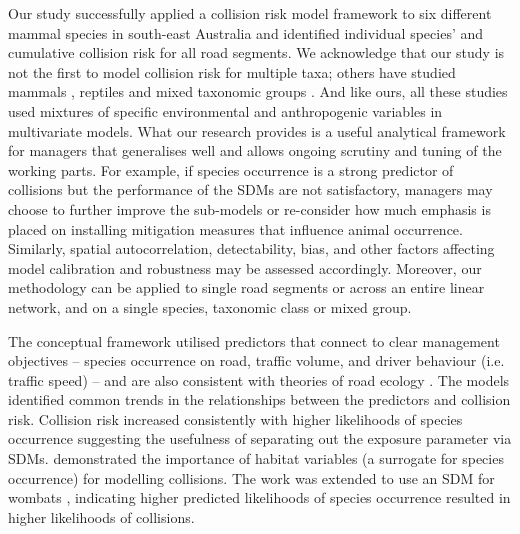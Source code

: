 Our study successfully applied a collision risk model framework to six different mammal species in south-east Australia and identified individual species' and cumulative collision risk for all road segments. We acknowledge that our study is not the first to model collision risk for multiple taxa; others have studied mammals \citep{clev02,cser13,jaar06}, reptiles \citep{guns12,lang12} and mixed taxonomic groups \citep{clev02,garr15,lang09,litv08}.  And like ours, all these studies used mixtures of specific environmental and anthropogenic variables in multivariate models. What our research provides is a useful analytical framework for managers that generalises well and allows ongoing scrutiny and tuning of the working parts.  For example, if species occurrence is a strong predictor of collisions but the performance of the SDMs are not satisfactory, managers may choose to further improve the sub-models or re-consider how much emphasis is placed on installing mitigation measures that influence animal occurrence.  Similarly, spatial autocorrelation, detectability, bias, and other factors affecting model calibration and robustness may be assessed accordingly. Moreover, our methodology can be applied to single road segments or across an entire linear network, and on a single species, taxonomic class or mixed group.

The conceptual framework utilised predictors that connect to clear management objectives -- species occurrence on road, traffic volume, and driver behaviour (i.e. traffic speed) -- and are also consistent with theories of road ecology \citep[see][]{form03}. The models identified common trends in the relationships between the predictors and collision risk. Collision risk increased consistently with higher likelihoods of species occurrence suggesting the usefulness of separating out the exposure parameter via SDMs. \cite{roge09} demonstrated the importance of habitat variables (a surrogate for species occurrence) for modelling collisions. The work was extended to use an SDM for wombats \citep{roge12}, indicating higher predicted likelihoods of species occurrence resulted in higher likelihoods of collisions.

